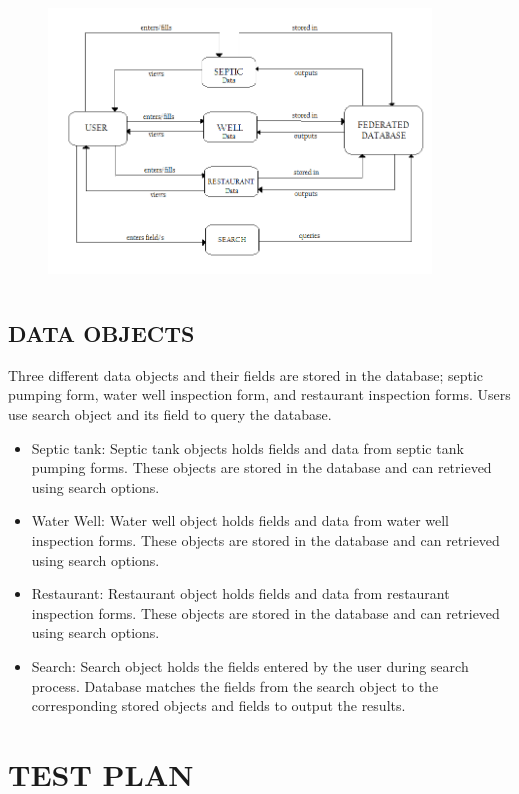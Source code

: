 \documentclass[twoside,letterpaper]{article}
\begin{document}
\begin{figure}[H]
\centering
\renewcommand{\figurename}{DFD}
\includegraphics[width=4in,height=3in]{Diagram2.png}
\end{figure}

\subsection{DATA OBJECTS}
Three different data objects and their fields are stored in the database; septic pumping form, water well inspection form, and restaurant inspection forms.  Users use search object and its field to query the database.
\begin{itemize}
\item{Septic tank:}  Septic tank objects holds fields and data from septic tank pumping forms.  These objects are stored in the database and can retrieved using search options.

\item{Water Well:} Water well object holds fields and data from water well inspection forms.  These objects are stored in the database and can retrieved using search options.

\item{Restaurant:} Restaurant object holds fields and data from restaurant inspection forms.  These objects are stored in the database and can retrieved using search options.

\item{Search:} Search object holds the fields entered by the user during search process.  Database matches the fields from the search object to the corresponding stored objects and fields to output the results.
\end{itemize}

\clearpage\section[TEST PLAN]{\rmfamily\bfseries\color{black}
TEST PLAN}
\end{document}
